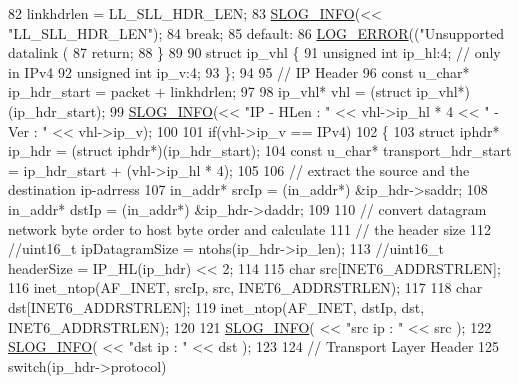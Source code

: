\begin{DoxyCode}
{82         linkhdrlen = LL\_SLL\_HDR\_LEN;
83         \hyperlink{_logger_8h_a119c1c29ba35a8db38e2358e41167282}{SLOG\_INFO}(<< \textcolor{stringliteral}{"LL\_SLL\_HDR\_LEN"});
84         \textcolor{keywordflow}{break};
85     \textcolor{keywordflow}{default}:
86         \hyperlink{_logger_8h_aa2ffef3c03ca18789b5d04ac9b260128}{LOG\_ERROR}((\textcolor{stringliteral}{"Unsupported datalink (%
87         \textcolor{keywordflow}{return};
88     \}
89 
90     \textcolor{keyword}{struct }ip\_vhl \{
91         \textcolor{keywordtype}{unsigned} \textcolor{keywordtype}{int} ip\_hl:4; \textcolor{comment}{// only in IPv4}
92         \textcolor{keywordtype}{unsigned} \textcolor{keywordtype}{int} ip\_v:4;
93     \};  
94 
95     \textcolor{comment}{// IP Header}
96     \textcolor{keyword}{const} u\_char* ip\_hdr\_start = packet + linkhdrlen;
97 
98     ip\_vhl* vhl = (\textcolor{keyword}{struct }ip\_vhl*)(ip\_hdr\_start);
99     \hyperlink{_logger_8h_a119c1c29ba35a8db38e2358e41167282}{SLOG\_INFO}(<< \textcolor{stringliteral}{"IP - HLen : "} << vhl->ip\_hl * 4 << \textcolor{stringliteral}{" - Ver : "} << vhl->ip\_v);
100 
101     \textcolor{keywordflow}{if}(vhl->ip\_v == IPv4)
102     \{
103         \textcolor{keyword}{struct }iphdr* ip\_hdr = (\textcolor{keyword}{struct }iphdr*)(ip\_hdr\_start);
104         \textcolor{keyword}{const} u\_char* transport\_hdr\_start = ip\_hdr\_start + (vhl->ip\_hl * 4);
105 
106         \textcolor{comment}{// extract the source and the destination ip-adrress}
107         in\_addr* srcIp = (in\_addr*) &ip\_hdr->saddr;
108         in\_addr* dstIp = (in\_addr*) &ip\_hdr->daddr;
109 
110         \textcolor{comment}{// convert datagram network byte order to host byte order and calculate}
111         \textcolor{comment}{// the header size}
112         \textcolor{comment}{//uint16\_t ipDatagramSize = ntohs(ip\_hdr->ip\_len);}
113         \textcolor{comment}{//uint16\_t headerSize     = IP\_HL(ip\_hdr) << 2;}
114 
115         \textcolor{keywordtype}{char} src[INET6\_ADDRSTRLEN];
116         inet\_ntop(AF\_INET, srcIp, src, INET6\_ADDRSTRLEN);
117 
118         \textcolor{keywordtype}{char} dst[INET6\_ADDRSTRLEN];
119         inet\_ntop(AF\_INET, dstIp, dst, INET6\_ADDRSTRLEN);
120 
121         \hyperlink{_logger_8h_a119c1c29ba35a8db38e2358e41167282}{SLOG\_INFO}( << \textcolor{stringliteral}{"src ip : "} << src );
122         \hyperlink{_logger_8h_a119c1c29ba35a8db38e2358e41167282}{SLOG\_INFO}( << \textcolor{stringliteral}{"dst ip : "} << dst );
123 
124         \textcolor{comment}{// Transport Layer Header}
125         \textcolor{keywordflow}{switch}(ip\_hdr->protocol)
}}
\end{DoxyCode}
